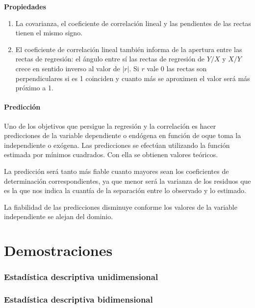 \documentclass[10pt, a4paper]{article}
\theoremstyle{theorem-style}
\theoremstyle{definition-style}
\theoremstyle{remark-style}
\theoremstyle{example-style}
\theoremstyle{definition-style}
\theoremstyle{remark-style}
\begin{document}
\textbf{Propiedades}

\begin{enumerate}
	\item La covarianza, el coeficiente de correlación lineal y las pendientes de las
rectas tienen el mismo signo.

	\item El coeficiente de correlación lineal también informa de la apertura entre las
rectas de regresión: el ángulo entre sí las rectas de regresión de $Y/X$ y $X/Y$
crece en sentido inverso al valor de $ |r| $. Si $r$ vale 0 las rectas son
perpendiculares si es 1 coinciden y cuanto más se aproximen el valor será más
próximo a 1.
\end{enumerate}

\pagebreak

\subsection{Predicción}

Uno de los objetivos que persigue la regresión y la correlación es hacer
predicciones de la variable dependiente o endógena en función de oque toma la
independiente o exógena. Las predicciones se efectúan utilizando la función
estimada por mínimos cuadrados. Con ella se obtienen valores teóricos.

La
predicción será tanto más fiable cuanto mayores sean los coeficientes de
determinación correspondientes, ya que menor será la varianza de los residuos
que es la que nos indica la cuantía de la separación entre lo observado y lo
estimado.

La fiabilidad de las predicciones disminuye conforme los valores de la variable
independiente se alejan del dominio.

\pagebreak
\part{Demostraciones}

\section{Estadística descriptiva unidimensional}

\section{Estadística descriptiva bidimensional}
\end{document}
